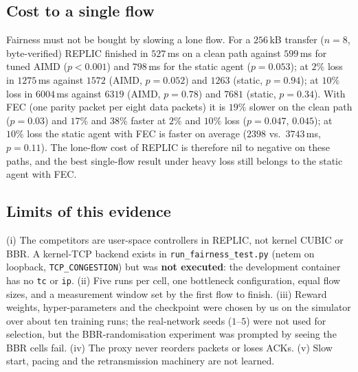 \subsection{Cost to a single flow}
Fairness must not be bought by slowing a lone flow. For a $256$\,kB transfer ($n=8$, byte-verified) REPLIC finished in $527$\,ms on a clean path against $599$\,ms for tuned AIMD ($p<0.001$) and $798$\,ms for the static agent ($p=0.053$); at $2\%$ loss in $1275$\,ms against $1572$ (AIMD, $p=0.052$) and $1263$ (static, $p=0.94$); at $10\%$ loss in $6004$\,ms against $6319$ (AIMD, $p=0.78$) and $7681$ (static, $p=0.34$). With FEC (one parity packet per eight data packets) it is $19\%$ slower on the clean path ($p=0.03$) and $17\%$ and $38\%$ faster at $2\%$ and $10\%$ loss ($p=0.047$, $0.045$); at $10\%$ loss the static agent with FEC is faster on average ($2398$ vs.\ $3743$\,ms, $p=0.11$). The lone-flow cost of REPLIC is therefore nil to negative on these paths, and the best single-flow result under heavy loss still belongs to the static agent with FEC.

\subsection{Limits of this evidence}
(i) The competitors are user-space controllers in REPLIC, not kernel CUBIC or BBR. A kernel-TCP backend exists in \texttt{run\_fairness\_test.py} (netem on loopback, \texttt{TCP\_CONGESTION}) but was \textbf{not executed}: the development container has no \texttt{tc} or \texttt{ip}. (ii) Five runs per cell, one bottleneck configuration, equal flow sizes, and a measurement window set by the first flow to finish. (iii) Reward weights, hyper-parameters and the checkpoint were chosen by us on the simulator over about ten training runs; the real-network seeds ($1$--$5$) were not used for selection, but the BBR-randomisation experiment was prompted by seeing the BBR cells fail. (iv) The proxy never reorders packets or loses ACKs. (v) Slow start, pacing and the retransmission machinery are not learned.
